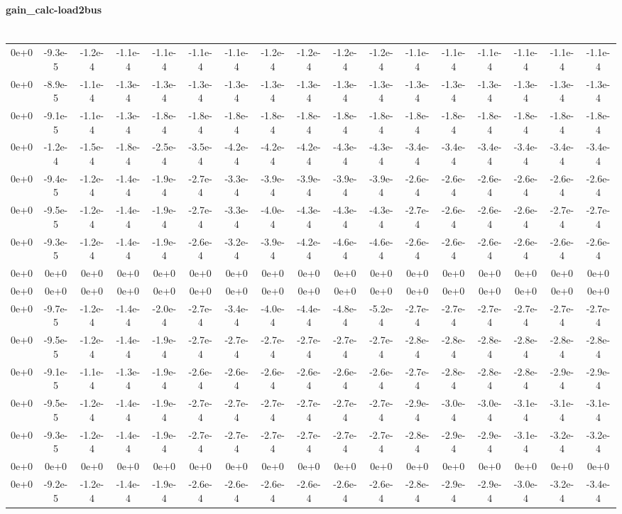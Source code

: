 \documentclass[a4paper,twoside]{article}
\begin{document}
\paragraph{gain\_calc-load2bus\\\\}
\tiny
\hspace{-70pt}
\begin{tabular}{ccccccccccccccccc}
	0e+0&-9.3e-5&-1.2e-4&-1.1e-4&-1.1e-4&-1.1e-4&-1.1e-4&-1.2e-4&-1.2e-4&-1.2e-4&-1.2e-4&-1.1e-4&-1.1e-4&-1.1e-4&-1.1e-4&-1.1e-4&-1.1e-4\\
	0e+0&-8.9e-5&-1.1e-4&-1.3e-4&-1.3e-4&-1.3e-4&-1.3e-4&-1.3e-4&-1.3e-4&-1.3e-4&-1.3e-4&-1.3e-4&-1.3e-4&-1.3e-4&-1.3e-4&-1.3e-4&-1.3e-4\\
	0e+0&-9.1e-5&-1.1e-4&-1.3e-4&-1.8e-4&-1.8e-4&-1.8e-4&-1.8e-4&-1.8e-4&-1.8e-4&-1.8e-4&-1.8e-4&-1.8e-4&-1.8e-4&-1.8e-4&-1.8e-4&-1.8e-4\\
	0e+0&-1.2e-4&-1.5e-4&-1.8e-4&-2.5e-4&-3.5e-4&-4.2e-4&-4.2e-4&-4.2e-4&-4.3e-4&-4.3e-4&-3.4e-4&-3.4e-4&-3.4e-4&-3.4e-4&-3.4e-4&-3.4e-4\\
	0e+0&-9.4e-5&-1.2e-4&-1.4e-4&-1.9e-4&-2.7e-4&-3.3e-4&-3.9e-4&-3.9e-4&-3.9e-4&-3.9e-4&-2.6e-4&-2.6e-4&-2.6e-4&-2.6e-4&-2.6e-4&-2.6e-4\\
	0e+0&-9.5e-5&-1.2e-4&-1.4e-4&-1.9e-4&-2.7e-4&-3.3e-4&-4.0e-4&-4.3e-4&-4.3e-4&-4.3e-4&-2.7e-4&-2.6e-4&-2.6e-4&-2.6e-4&-2.7e-4&-2.7e-4\\
	0e+0&-9.3e-5&-1.2e-4&-1.4e-4&-1.9e-4&-2.6e-4&-3.2e-4&-3.9e-4&-4.2e-4&-4.6e-4&-4.6e-4&-2.6e-4&-2.6e-4&-2.6e-4&-2.6e-4&-2.6e-4&-2.6e-4\\
	0e+0&0e+0&0e+0&0e+0&0e+0&0e+0&0e+0&0e+0&0e+0&0e+0&0e+0&0e+0&0e+0&0e+0&0e+0&0e+0&0e+0\\
	0e+0&0e+0&0e+0&0e+0&0e+0&0e+0&0e+0&0e+0&0e+0&0e+0&0e+0&0e+0&0e+0&0e+0&0e+0&0e+0&0e+0\\
	0e+0&-9.7e-5&-1.2e-4&-1.4e-4&-2.0e-4&-2.7e-4&-3.4e-4&-4.0e-4&-4.4e-4&-4.8e-4&-5.2e-4&-2.7e-4&-2.7e-4&-2.7e-4&-2.7e-4&-2.7e-4&-2.7e-4\\
	0e+0&-9.5e-5&-1.2e-4&-1.4e-4&-1.9e-4&-2.7e-4&-2.7e-4&-2.7e-4&-2.7e-4&-2.7e-4&-2.7e-4&-2.8e-4&-2.8e-4&-2.8e-4&-2.8e-4&-2.8e-4&-2.8e-4\\
	0e+0&-9.1e-5&-1.1e-4&-1.3e-4&-1.9e-4&-2.6e-4&-2.6e-4&-2.6e-4&-2.6e-4&-2.6e-4&-2.6e-4&-2.7e-4&-2.8e-4&-2.8e-4&-2.8e-4&-2.9e-4&-2.9e-4\\
	0e+0&-9.5e-5&-1.2e-4&-1.4e-4&-1.9e-4&-2.7e-4&-2.7e-4&-2.7e-4&-2.7e-4&-2.7e-4&-2.7e-4&-2.9e-4&-3.0e-4&-3.0e-4&-3.1e-4&-3.1e-4&-3.1e-4\\
	0e+0&-9.3e-5&-1.2e-4&-1.4e-4&-1.9e-4&-2.7e-4&-2.7e-4&-2.7e-4&-2.7e-4&-2.7e-4&-2.7e-4&-2.8e-4&-2.9e-4&-2.9e-4&-3.1e-4&-3.2e-4&-3.2e-4\\
	0e+0&0e+0&0e+0&0e+0&0e+0&0e+0&0e+0&0e+0&0e+0&0e+0&0e+0&0e+0&0e+0&0e+0&0e+0&0e+0&0e+0\\
	0e+0&-9.2e-5&-1.2e-4&-1.4e-4&-1.9e-4&-2.6e-4&-2.6e-4&-2.6e-4&-2.6e-4&-2.6e-4&-2.6e-4&-2.8e-4&-2.9e-4&-2.9e-4&-3.0e-4&-3.2e-4&-3.4e-4\\
\end{tabular} 
\normalsize
\end{document}
